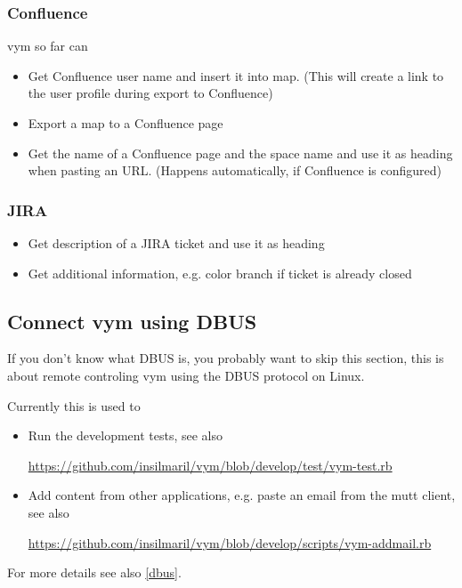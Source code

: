 \documentclass[12pt,a4paper]{article}
\newcommand{\vym}{{\sc vym }}
\begin{document}
\subsubsection{Confluence}
\vym so far can
\begin{itemize}
    \item Get Confluence user name and insert it into map. (This will
        create a link to the user profile during export to Confluence)
    \item Export a map to a Confluence page
    \item Get the name of a Confluence page and the space name and use
        it as heading when pasting an URL. (Happens automatically, if
        Confluence is configured)
\end{itemize}

\subsubsection{JIRA}
\begin{itemize}
    \item Get description of a JIRA ticket and use it as heading
    \item Get additional information, e.g. color branch if ticket is
        already closed
\end{itemize}

\subsection{Connect vym using DBUS}
If you don't know what DBUS is, you probably want to skip this section,
this is about remote controling \vym using the DBUS protocol on Linux.

Currently this is used to
\begin{itemize}
    \item Run the development tests, see also 

        \href{https://github.com/insilmaril/vym/blob/develop/test/vym-test.rb}
        {https://github.com/insilmaril/vym/blob/develop/test/vym-test.rb}
    \item Add content from other applications, e.g. paste an email from
        the mutt client, see also 

        \href{https://github.com/insilmaril/vym/blob/develop/scripts/vym-addmail.rb}
        {https://github.com/insilmaril/vym/blob/develop/scripts/vym-addmail.rb}
\end{itemize}
For more details see also \ref{dbus}.
\end{document}
